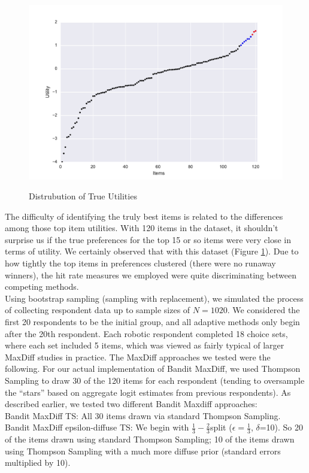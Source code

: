 \documentclass[mksc,blindrev]{informs3} %
\begin{document}
\begin{figure}[!ht]
\caption{Distrubution of True Utilities}
\includegraphics[width=1\textwidth]{plots/utilscore.pdf}
\label{fig:util}
\end{figure}
The difficulty of identifying the truly best items is related to the differences among those top item utilities. With 120 items in the dataset, it shouldn’t surprise us if the true preferences for the top 15 or so items were very close in terms of utility.  We certainly observed that with this dataset (Figure \ref{fig:util}).  Due to how tightly the top items in preferences clustered (there were no runaway winners), the hit rate measures we employed were quite discriminating between competing methods.\\
Using bootstrap sampling (sampling with replacement), we simulated the process of collecting respondent data up to sample sizes of $N=1020$.  We considered the first 20 respondents to be the initial group, and all adaptive methods only begin after the 20th respondent. Each robotic respondent completed 18 choice sets, where each set included 5 items, which was viewed as fairly typical of larger MaxDiff studies in practice.
The MaxDiff approaches we tested were the following. For our actual implementation of Bandit MaxDiff, we used Thompson Sampling to draw 30 of the 120 items for each respondent (tending to oversample the ``stars'' based on aggregate logit estimates from previous respondents).  As described earlier, we tested two different Bandit Maxdiff approaches:\\
Bandit MaxDiff TS: All 30 items drawn via standard Thompson Sampling.\\
Bandit MaxDiff epsilon-diffuse TS: We begin with $\frac{1}{3}-\frac{2}{3} $split ($\epsilon=\frac{1}{3}$, $\delta$=10). So 20 of the items drawn using standard Thompson Sampling; 10 of the items drawn using Thompson Sampling with a much more diffuse prior (standard errors multiplied by 10).\\
\end{document}
